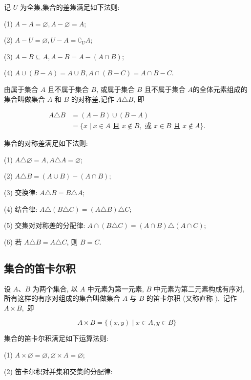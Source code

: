记 $U$ 为全集,集合的差集满足如下法则:

(1) $A-A=\varnothing, A-\varnothing=A$;

(2) $A-U=\varnothing, U-A=\complement_{U} A$;

(3) $A-B \subseteq A, A-B=A-(A \cap B)$;

(4) $A \cup(B-A)=A \cup B, A \cap(B-C)=A \cap B-C$.

\begin{definition}
	由属于集合 $A$ 且不属于集合 $B$, 或属于集合 $B$ 且不属于集合 $A$的全体元素组成的集合叫做集合 $A$ 和 $B$ 的对称差,记作 $A \triangle B$, 即

	$$
		\begin{aligned}
			A \triangle B & =(A-B) \cup(B-A)                                                                         \\
			              & =\{x \mid x \in A \text { 且 } x \notin B, \text { 或 } x \in B \text { 且 } x \notin A\} .
		\end{aligned}
	$$
\end{definition}

集合的对称差满足如下法则:

(1) $A \triangle \varnothing=A, A \triangle A=\varnothing$;

(2) $A \triangle B=(A \cup B)-(A \cap B)$;

(3) 交换律: $A \triangle B=B \triangle A$;

(4) 结合律: $A \triangle(B \triangle C)=(A \triangle B) \triangle C$;

(5) 交集对对称差的分配律: $A \cap(B \triangle C)=(A \cap B) \triangle(A \cap C)$;

(6) 若 $A \triangle B=A \triangle C$, 则 $B=C$.

\subsection{集合的笛卡尔积}
\begin{definition}
	设 $A 、 B$ 为两个集合, 以 $A$ 中元素为第一元素, $B$ 中元素为第二元素构成有序对, 所有这样的有序对组成的集合叫做集合 $A$ 与 $B$ 的笛卡尔积 (又称直称 $),$ 记作 $A \times B , $ 即

	$$
		A \times B=\{(x, y) \mid x \in A, y \in B\}
	$$
\end{definition}
集合的笛卡尔积满足如下运算法则:

(1) $A \times \varnothing=\varnothing, \varnothing \times A=\varnothing$;

(2) 笛卡尔积对并集和交集的分配律:

